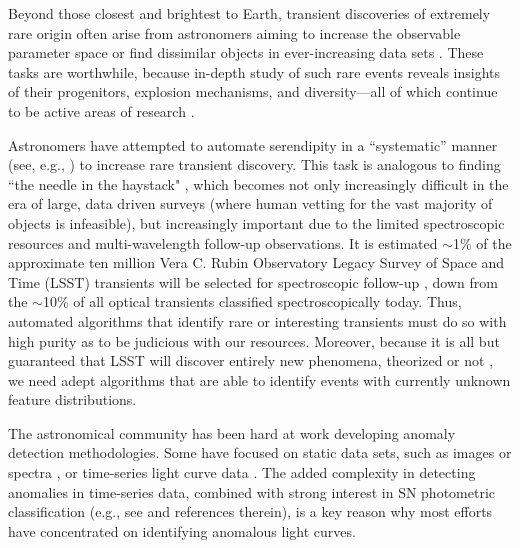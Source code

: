 \documentclass[twocolumn]{aastex63}
\begin{document}
Beyond those closest and brightest to Earth, transient discoveries of extremely rare origin often arise from astronomers aiming to increase the observable parameter space or find dissimilar objects in ever-increasing data sets \citep{Li2022}. These tasks are worthwhile, because in-depth study of such rare events reveals insights of their progenitors, explosion mechanisms, and diversity---all of which continue to be active areas of research \citep[see, e.g.][]{Margutti2019,Gagliano2022,Galan2022tlf,Perley2022,Kuncarayakti2023,Pierel2023}.  \par 

Astronomers have attempted to automate serendipity in a ``systematic'' manner (see, e.g., \citealt{Giles2019}) to increase rare transient discovery. This task is analogous to finding ``the needle in the haystack" \citep[See, e.g.,][]{Villar2019}, which becomes not only increasingly difficult in the era of large, data driven surveys (where human vetting for the vast majority of objects is infeasible), but increasingly important due to the limited spectroscopic resources and multi-wavelength follow-up observations. It is estimated $\sim$1\% of the approximate ten million Vera C. Rubin Observatory \citep{Ivezic2019} Legacy Survey of Space and Time (LSST) transients will be selected for spectroscopic follow-up \citep{hambleton2022rubin}, down from the $\sim$10\% of all optical transients classified spectroscopically today. Thus, automated algorithms that identify rare or interesting transients must do so with high purity as to be judicious with our resources. Moreover, because it is all but guaranteed that LSST will discover entirely new phenomena, theorized or not \citep{Li2022, hambleton2022rubin}, we need adept algorithms that are able to identify events with currently unknown feature distributions. \par

The astronomical community has been hard at work developing anomaly detection methodologies. Some have focused on static data sets, such as images \citep{Reyes2020arXiv, Storey-Fisher2021, Etsebeth2023} or spectra \citep{Liang2023, Bohm2023}, or time-series light curve data \citep{Rebbapragada2009,Nun2014,Nun2016,Solarz2017,Giles2019,Pruzhinskaya2019,Soraisam2020,Webb2020,Villar2021,Galarza2021,Lochner2021,Ishida2021,Malanchev2021,Perez-Carrasco2023,Cui2023}. The added complexity in detecting anomalies in time-series data, combined with strong interest in SN photometric classification (e.g., see \citealt{Lochner2016,Muthukrishna2019,Moller2020,Villar2020,Qu2021,2022Gagliano_CCA,Aleo2023} and references therein), is a key reason why most efforts have concentrated on identifying anomalous light curves. \par
\end{document}

